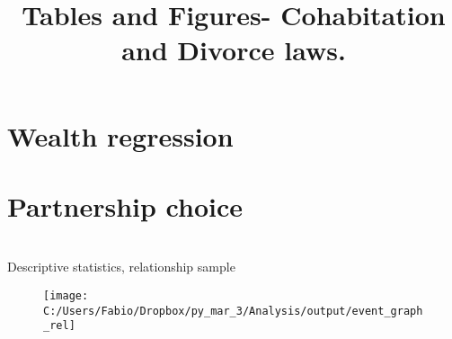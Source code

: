 \documentclass[12pt]{article}
\title{Tables and Figures- Cohabitation and Divorce laws.}
\author{}
\begin{document}
 	 
 	 
 	\maketitle
 	
 	\section{Wealth regression}
 	
 	
 \section{Partnership choice}


\begin{table}[!htbp]\centering
	\caption{\\Descriptive statistics, relationship sample}
	\label{table:sum_rel}
	
\end{table}
\FloatBarrier

%

 \begin{figure}
	\centering
	\texttt{[image: C:/Users/Fabio/Dropbox/py\_mar\_3/Analysis/output/event\_graph\_rel]}
	\caption{}
	\label{fig:eventgraphrel}
\end{figure}


	
	
	
\end{document}
